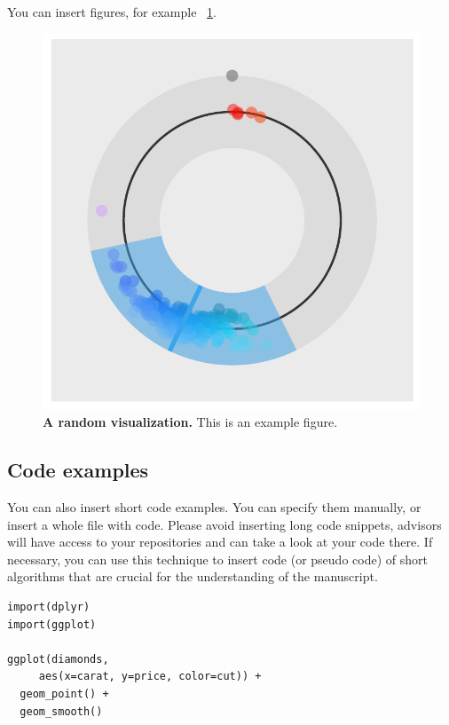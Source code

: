 \documentclass[fleqn,oneauthor,9pt]{ds_report}
\begin{document}
You can insert figures, for example \figurename~\ref{fig:column}.

\begin{figure}[ht]\centering
  \includegraphics[width=\linewidth]{figure_example.pdf}
  \caption{\textbf{A random visualization.} This is an example figure.}
  \label{fig:column}
\end{figure}

\subsection*{Code examples}

You can also insert short code examples. You can specify them manually, or insert a whole file with code. Please avoid inserting long code snippets, advisors will have access to your repositories and can take a look at your code there. If necessary, you can use this technique to insert code (or pseudo code) of short algorithms that are crucial for the understanding of the manuscript.

\lstset{language=Python}


\lstset{language=R}
\begin{lstlisting}
import(dplyr)
import(ggplot)

ggplot(diamonds,
     aes(x=carat, y=price, color=cut)) +
  geom_point() +
  geom_smooth()
\end{lstlisting}
\end{document}
